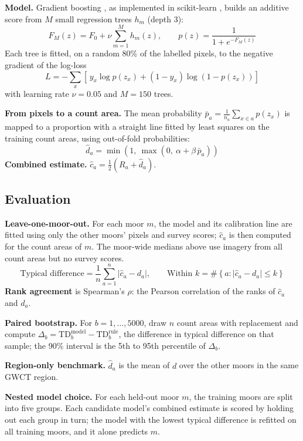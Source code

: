 \documentclass[11pt,a4paper]{article}
\begin{document}
\textbf{Model.} Gradient boosting \citep{friedman2001}, as implemented in scikit-learn \citep{pedregosa2011}, builds an additive score from $M$ small regression trees $h_m$ (depth 3):
\[
F_M(z) = F_0 + \nu\sum_{m=1}^{M} h_m(z), \qquad p(z) = \frac{1}{1+e^{-F_M(z)}}
\]
Each tree is fitted, on a random 80\% of the labelled pixels, to the negative gradient of the log-loss
\[
L = -\sum_x \left[\,y_x \log p(z_x) + (1-y_x)\log\!\left(1-p(z_x)\right)\right]
\]
with learning rate $\nu = 0.05$ and $M = 150$ trees.

\textbf{From pixels to a count area.} The mean probability $\bar p_a = \frac{1}{n_a}\sum_{x\in a} p(z_x)$ is mapped to a proportion with a straight line fitted by least squares on the training count areas, using out-of-fold probabilities:
\[
\hat d_a = \min\!\left(1,\ \max\!\left(0,\ \alpha + \beta\,\bar p_a\right)\right)
\]
\textbf{Combined estimate.} $\hat c_a = \tfrac{1}{2}\left(R_a + \hat d_a\right)$.

\subsection{Evaluation}
\textbf{Leave-one-moor-out.} For each moor $m$, the model and its calibration line are fitted using only the other moors' pixels and survey scores; $\hat c_a$ is then computed for the count areas of $m$. The moor-wide medians above use imagery from all count areas but no survey scores.
\[
\text{Typical difference} = \frac{1}{n}\sum_{a=1}^{n}\left|\hat c_a - d_a\right|, \qquad \text{Within } k = \#\left\{a : \left|\hat c_a - d_a\right| \le k\right\}
\]
\textbf{Rank agreement} is Spearman's $\rho$: the Pearson correlation of the ranks of $\hat c_a$ and $d_a$.

\textbf{Paired bootstrap.} For $b = 1,\dots,5000$, draw $n$ count areas with replacement and compute $\Delta_b = \mathrm{TD}^{\text{model}}_b - \mathrm{TD}^{\text{rule}}_b$, the difference in typical difference on that sample; the 90\% interval is the 5th to 95th percentile of $\Delta_b$.

\textbf{Region-only benchmark.} $\hat d_a$ is the mean of $d$ over the other moors in the same GWCT region.

\textbf{Nested model choice.} For each held-out moor $m$, the training moors are split into five groups. Each candidate model's combined estimate is scored by holding out each group in turn; the model with the lowest typical difference is refitted on all training moors, and it alone predicts $m$.
\end{document}

